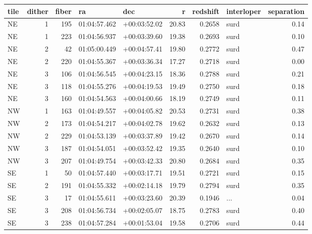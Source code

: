 \begin{tabular}{lrrllrrlr}
\toprule
tile &  dither &  fiber &            ra &           dec &      r &  redshift & interloper &  separation \\
\midrule
  NE &       1 &    195 &  01:04:57.462 &  +00:03:52.02 &  20.83 &    0.2658 &       surd &        0.14 \\
  NE &       1 &    223 &  01:04:56.937 &  +00:03:39.60 &  19.38 &    0.2693 &       surd &        0.10 \\
  NE &       2 &     42 &  01:05:00.449 &  +00:04:57.41 &  19.80 &    0.2772 &       surd &        0.47 \\
  NE &       2 &    220 &  01:04:55.367 &  +00:03:36.34 &  17.27 &    0.2718 &       surd &        0.00 \\
  NE &       3 &    106 &  01:04:56.545 &  +00:04:23.15 &  18.36 &    0.2788 &       surd &        0.21 \\
  NE &       3 &    118 &  01:04:55.276 &  +00:04:19.53 &  19.49 &    0.2750 &       surd &        0.18 \\
  NE &       3 &    160 &  01:04:54.563 &  +00:04:00.66 &  18.19 &    0.2749 &       surd &        0.11 \\
  NW &       1 &    163 &  01:04:49.557 &  +00:04:05.82 &  20.53 &    0.2731 &       surd &        0.38 \\
  NW &       2 &    173 &  01:04:54.217 &  +00:04:02.78 &  19.62 &    0.2632 &       surd &        0.13 \\
  NW &       2 &    229 &  01:04:53.139 &  +00:03:37.89 &  19.42 &    0.2670 &       surd &        0.14 \\
  NW &       3 &    187 &  01:04:54.051 &  +00:03:52.42 &  19.35 &    0.2640 &       surd &        0.10 \\
  NW &       3 &    207 &  01:04:49.754 &  +00:03:42.33 &  20.80 &    0.2684 &       surd &        0.35 \\
  SE &       1 &     50 &  01:04:57.440 &  +00:03:17.71 &  19.51 &    0.2721 &       surd &        0.15 \\
  SE &       2 &    191 &  01:04:55.332 &  +00:02:14.18 &  19.79 &    0.2794 &       surd &        0.35 \\
  SE &       3 &     17 &  01:04:55.611 &  +00:03:23.60 &  20.39 &    0.1946 &        ... &        0.04 \\
  SE &       3 &    208 &  01:04:56.734 &  +00:02:05.07 &  18.75 &    0.2783 &       surd &        0.40 \\
  SE &       3 &    238 &  01:04:57.284 &  +00:01:53.04 &  19.58 &    0.2706 &       surd &        0.44 \\

\end{tabular}
